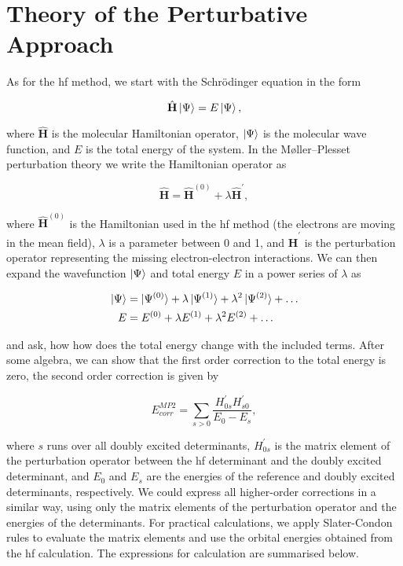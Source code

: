 \section{Theory of the Perturbative Approach}

As for the \acrshort{hf} method, we start with the Schrödinger equation in the form

\begin{equation}
\hat{\mathbf{H}}\ket{\Psi}=E\ket{\Psi},
\end{equation}

where \(\hat{\mathbf{H}}\) is the molecular Hamiltonian operator, \(\ket{\Psi}\) is the molecular wave function, and \(E\) is the total energy of the system. In the Møller--Plesset perturbation theory we write the Hamiltonian operator as

\begin{equation}
\hat{\mathbf{H}}=\hat{\mathbf{H}}^{(0)}+\lambda\hat{\mathbf{H}}^{'},
\end{equation}

where \(\hat{\mathbf{H}}^{(0)}\) is the Hamiltonian used in the \acrshort{hf} method (the electrons are moving in the mean field), \(\lambda\) is a parameter between 0 and 1, and \(\hat{\mathbf{H}}^{'}\) is the perturbation operator representing the missing electron-electron interactions. We can then expand the wavefunction \(\ket{\Psi}\) and total energy \(E\) in a power series of \(\lambda\) as

\begin{align}
\ket{\Psi}&=\ket{\Psi^{(0)}}+\lambda\ket{\Psi^{(1)}}+\lambda^2\ket{\Psi^{(2)}}+\dots \\
E&=E^{(0)}+\lambda E^{(1)}+\lambda^2 E^{(2)}+\dots
\end{align}

and ask, how how does the total energy change with the included terms. After some algebra, we can show that the first order correction to the total energy is zero, the second order correction is given by

\begin{equation}
E_{corr}^{MP2}=\sum_{s>0}\frac{H_{0s}^{'}H_{s0}^{'}}{E_0-E_s},
\end{equation}

where \(s\) runs over all doubly excited determinants, \(H_{0s}^{'}\) is the matrix element of the perturbation operator between the \acrshort{hf} determinant and the doubly excited determinant, and \(E_0\) and \(E_s\) are the energies of the reference and doubly excited determinants, respectively.\cite{10.1002/wcms.58,1014569052} We could express all higher-order corrections in a similar way, using only the matrix elements of the perturbation operator and the energies of the determinants. For practical calculations, we apply Slater-Condon rules to evaluate the matrix elements and use the orbital energies obtained from the \acrshort{hf} calculation. The expressions for calculation are summarised below.

